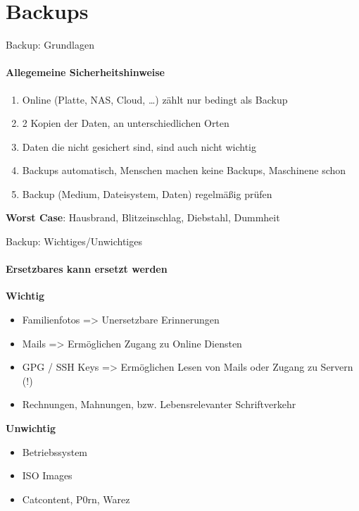 \section{Backups}

\begin{frame}{Backup: Grundlagen}
\framesubtitle{Allegemeine Sicherheitshinweise}
\begin{enumerate}
\item Online (Platte, NAS, Cloud, …) zählt nur bedingt als Backup
\pause
\item 2 Kopien der Daten, an unterschiedlichen Orten
\pause
\item Daten die nicht gesichert sind, sind auch nicht wichtig
\pause
\item Backups automatisch, Menschen machen keine Backups, Maschinene schon
\pause
\item Backup (Medium, Dateisystem, Daten) regelmäßig prüfen
\end{enumerate}
\pause
\textbf{Worst Case}: Hausbrand, Blitzeinschlag, Diebstahl, Dummheit
\end{frame}

\begin{frame}{Backup: Wichtiges/Unwichtiges}
\framesubtitle{Ersetzbares kann ersetzt werden}
\pause
\textbf{Wichtig}
\begin{itemize}
\item Familienfotos => Unersetzbare Erinnerungen
\pause
\item Mails => Ermöglichen Zugang zu Online Diensten
\pause
\item GPG / SSH Keys => Ermöglichen Lesen von Mails oder Zugang zu Servern (!)
\pause
\item Rechnungen, Mahnungen, bzw. Lebensrelevanter Schriftverkehr
\end{itemize}
\pause
\textbf{Unwichtig}
\begin{itemize}
\item Betriebssystem
\pause
\item ISO Images
\pause
\item Catcontent, P0rn, Warez
\end{itemize}
\end{frame}
